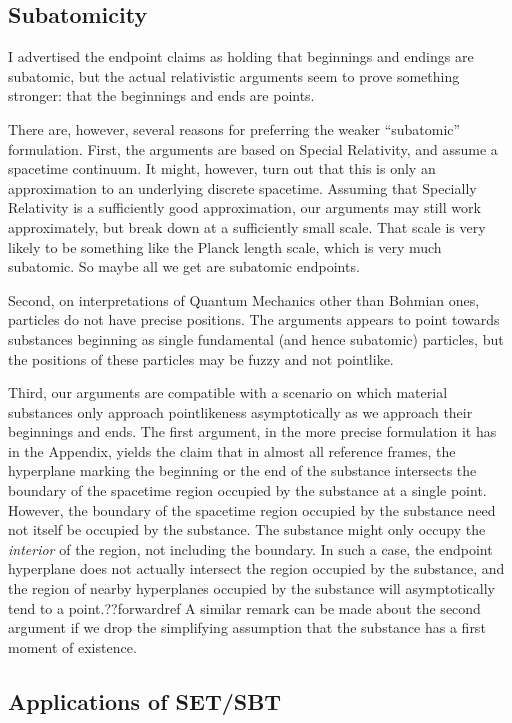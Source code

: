 \subsection{Subatomicity}
I advertised the endpoint claims as holding that beginnings and endings are subatomic, but the actual relativistic 
arguments seem to prove something stronger: that the beginnings and ends are points.

There are, however, several reasons for preferring the weaker ``subatomic'' formulation. First, the arguments are based
on Special Relativity, and assume a spacetime continuum. It might, however, turn out that this is only an approximation 
to an underlying discrete spacetime. Assuming that Specially Relativity is a sufficiently good approximation, our arguments may 
still work approximately, but break down at a sufficiently small scale. That scale is very likely to be something like the 
Planck length scale, which is very much subatomic. So maybe all we get are subatomic endpoints.

Second, on interpretations of Quantum Mechanics other than Bohmian ones, particles do not have precise positions. The arguments 
appears to point towards substances beginning as single fundamental (and hence subatomic) particles, but the positions of these
particles may be fuzzy and not pointlike. 

Third, our arguments are compatible with a scenario on which material substances only approach pointlikeness asymptotically
as we approach their beginnings and ends. The first argument, in the more precise formulation it has in the 
Appendix, yields the claim that in almost all reference frames, the hyperplane marking the beginning or the end of the 
substance intersects the boundary of the spacetime region occupied by the substance at a single point. However, the boundary
of the spacetime region occupied by the substance need not itself be occupied by the substance. The substance might only 
occupy the \textit{interior} of the region, not including the boundary. In such a case, the endpoint hyperplane does not actually
intersect the region occupied by the substance, and the region of nearby hyperplanes occupied by the substance will asymptotically
tend to a point.??forwardref  A similar remark can be made about the second argument if we drop the simplifying assumption that
the substance has a first moment of existence.

\subsection{Applications of SET/SBT}
